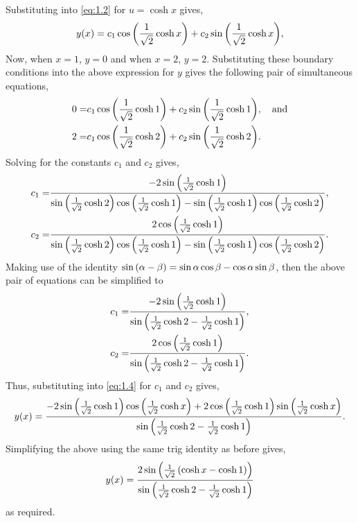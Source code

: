 \def\osx[#1]{{\L\frac{1}{\sqrt{2}}\cosh {#1}\R}}%
\def\os2{\frac{1}{\sqrt{2}}}%
Substituting into \eqref{eq:1.2} for $u=\cosh x$ gives,
\begin{equation}
\label{eq:1.4}
	y(x) = c_1\cos\osx[x] + c_2\sin\osx[x],
\end{equation}
Now, when $x=1$, $y=0$ and when $x=2$, $y=2$. Substituting  these boundary conditions into the above expression for $y$ gives the following pair of simultaneous equations,
\begin{align*}
	0 =& c_1\cos\osx[1] + c_2\sin\osx[1],\quad\textrm{and}\\
	2 =& c_1\cos\osx[2] + c_2\sin\osx[2].
\end{align*}
Solving for the constants $c_1$ and $c_2$ gives,
\begin{align*}
	c_1 =&\frac{
				-2\sin\osx[1]
		      }
		      {
		      	\sin\osx[2]\cos\osx[1]-\sin\osx[1]\cos\osx[2]
		      },\\
	c_2 =&\frac{
				2\cos\osx[1]
		      }
		      {
		      	\sin\osx[2]\cos\osx[1]-\sin\osx[1]\cos\osx[2]
		      }.      
\end{align*}
Making use of the identity $\sin\left(\alpha-\beta\right) = \sin\alpha\cos\beta -\cos\alpha\sin\beta$, then the above pair of equations can be simplified to
\begin{align*}
	c_1 =&\frac{
				-2\sin\osx[1]
		      }
		      {
		      	\sin \L \os2 \cosh 2 - \os2 \cosh 1\R
		      },\\
	c_2 =&\frac{
				2\cos\osx[1]
		      }
		      {
		      	\sin \L \os2 \cosh 2 - \os2 \cosh 1\R
		      }.      
\end{align*}
Thus, substituting into \eqref{eq:1.4} for $c_1$ and $c_2$ gives,
\[
	y(x) = \frac{
				-2\sin\osx[1]\cos\osx[x] + 2\cos\osx[1]\sin\osx[x]
			}
			{
				\sin \L \os2 \cosh 2 - \os2 \cosh 1\R
			}.
\]
Simplifying the above using the same trig identity as before gives,
\[
	y(x) = \frac{
				2\sin\L\os2\L\cosh x - \cosh 1\R \R
			}
			{
				\sin \L \os2 \cosh 2 - \os2 \cosh 1\R
			}
\]
as required.